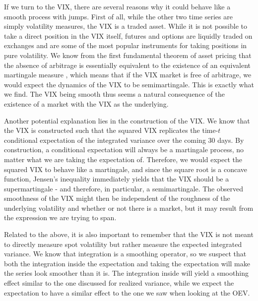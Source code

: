 \documentclass[fleqn,11pt,letterpaper]{article}
\theoremstyle{plain}
\theoremstyle{definition}
\theoremstyle{remark}
\numberwithin{equation}{section}
\begin{document}
If we turn to the VIX, there are several reasons why it could behave like a smooth process with jumps. First of all, while the other two time series are simply volatility measures, the VIX is a traded asset. While it is not possible to take a direct position in the VIX itself, futures and options are liquidly traded on exchanges and are some of the most popular instruments for taking positions in pure volatility. We know from the first fundamental theorem of asset pricing that the absence of arbitrage is essentially equivalent to the existence of an equivalent martingale measure \citep{bjoerk2009}, which means that if the VIX market is free of arbitrage, we would expect the dynamics of the VIX to be semimartingale. This is exactly what we find. The VIX being smooth thus seems a natural consequence of the existence of a market with the VIX as the underlying. 

Another potential explanation lies in the construction of the VIX. We know that the VIX is constructed such that the squared VIX replicates the time-$t$ conditional expectation of the integrated variance over the coming 30 days. By construction, a conditional expectation will always be a martingale process, no matter what we are taking the expectation of. Therefore, we would expect the squared VIX to behave like a martingale, and since the square root is a concave function, Jensen's inequality immediately yields that the VIX should be a supermartingale - and therefore, in particular, a semimartingale. The observed smoothness of the VIX might then be independent of the roughness of the underlying volatility and whether or not there is a market, but it may result from the expression we are trying to span. 

Related to the above, it is also important to remember that the VIX is not meant to directly measure spot volatility but rather measure the expected integrated variance. We know that integration is a smoothing operator, so we suspect that both the integration inside the expectation and taking the expectation will make the series look smoother than it is. The integration inside will yield a smoothing effect similar to the one discussed for realized variance, while we expect the expectation to have a similar effect to the one we saw when looking at the OEV.
\end{document}
